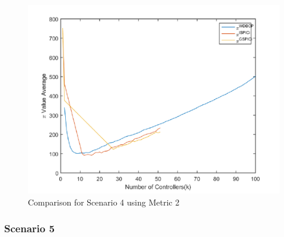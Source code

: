 \documentclass[10pt]{extarticle}
\begin{document}
	\begin{figure}
			\includegraphics[width=\linewidth]{our_comp_4.png}
			\caption{Comparison for Scenario 4 using Metric 2}
			\label{fig:ourcomp4}
	\end{figure}
	
	\subsubsection{Scenario 5}
	
\end{document}
